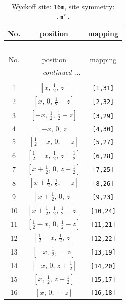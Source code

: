 \documentclass[fleqn,8pt]{jsarticle}
\begin{document}
\renewcommand{\arraystretch}{1.2}
\begin{longtable}{ccc}
\caption{Wyckoff site: {\tt 16m}, site symmetry: {\tt .m'.}}
 \\
 \hline \hline
No. & position & mapping \\ \hline \endfirsthead

\multicolumn{2}{l}{\tablename\ \thetable{}} \\
 \hline \hline
No. & position & mapping \\ \hline \endhead

 \hline \hline
\multicolumn{2}{r}{\footnotesize\it continued ...} \\ \endfoot

 \hline \hline
\multicolumn{2}{r}{} \\ \endlastfoot

1 & $\left[ x,\, \frac{1}{2},\, z \right]$ & {\tt [1,31]} \\ \hline
2 & $\left[ x,\, 0,\, \frac{1}{2} - z \right]$ & {\tt [2,32]} \\ \hline
3 & $\left[ - x,\, \frac{1}{2},\, \frac{1}{2} - z \right]$ & {\tt [3,29]} \\ \hline
4 & $\left[ - x,\, 0,\, z \right]$ & {\tt [4,30]} \\ \hline
5 & $\left[ \frac{1}{2} - x,\, 0,\, - z \right]$ & {\tt [5,27]} \\ \hline
6 & $\left[ \frac{1}{2} - x,\, \frac{1}{2},\, z + \frac{1}{2} \right]$ & {\tt [6,28]} \\ \hline
7 & $\left[ x + \frac{1}{2},\, 0,\, z + \frac{1}{2} \right]$ & {\tt [7,25]} \\ \hline
8 & $\left[ x + \frac{1}{2},\, \frac{1}{2},\, - z \right]$ & {\tt [8,26]} \\ \hline
9 & $\left[ x + \frac{1}{2},\, 0,\, z \right]$ & {\tt [9,23]} \\ \hline
10 & $\left[ x + \frac{1}{2},\, \frac{1}{2},\, \frac{1}{2} - z \right]$ & {\tt [10,24]} \\ \hline
11 & $\left[ \frac{1}{2} - x,\, 0,\, \frac{1}{2} - z \right]$ & {\tt [11,21]} \\ \hline
12 & $\left[ \frac{1}{2} - x,\, \frac{1}{2},\, z \right]$ & {\tt [12,22]} \\ \hline
13 & $\left[ - x,\, \frac{1}{2},\, - z \right]$ & {\tt [13,19]} \\ \hline
14 & $\left[ - x,\, 0,\, z + \frac{1}{2} \right]$ & {\tt [14,20]} \\ \hline
15 & $\left[ x,\, \frac{1}{2},\, z + \frac{1}{2} \right]$ & {\tt [15,17]} \\ \hline
16 & $\left[ x,\, 0,\, - z \right]$ & {\tt [16,18]} \\
\end{longtable}
\end{document}
